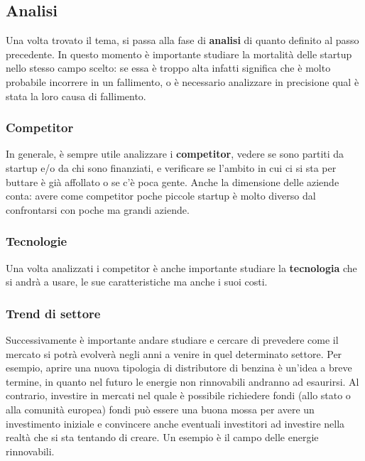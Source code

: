 \subsection{Analisi}
Una volta trovato il tema, si passa alla fase di \textbf{analisi} di quanto
definito al passo precedente. In questo momento è importante studiare la
mortalità delle startup nello stesso campo scelto: se essa è troppo alta
infatti significa che è molto probabile incorrere in un fallimento, o è
necessario analizzare in precisione qual è stata la loro causa di fallimento.

\subsubsection{Competitor}
In generale, è sempre utile analizzare i \textbf{competitor}, vedere se sono
partiti da startup e/o da chi sono finanziati, e verificare se l'ambito in cui
ci si sta per buttare è già affollato o se c'è poca gente. Anche la dimensione
delle aziende conta: avere come competitor poche piccole startup è molto
diverso dal confrontarsi con poche ma grandi aziende.

\subsubsection{Tecnologie}
Una volta analizzati i competitor è anche importante studiare la
\textbf{tecnologia} che si andrà a usare, le sue caratteristiche ma anche i
suoi costi.

\subsubsection{Trend di settore}
Successivamente è importante andare studiare e cercare di prevedere come il
mercato si potrà evolverà negli anni a venire in quel determinato settore.
Per esempio, aprire una nuova tipologia di distributore di benzina è un'idea a
breve termine, in quanto nel futuro le energie non rinnovabili andranno ad
esaurirsi. Al contrario, investire in mercati nel quale è possibile richiedere
fondi (allo stato o alla comunità europea) fondi può essere una buona mossa per
avere un investimento iniziale e convincere anche eventuali investitori ad
investire nella realtà che si sta tentando di creare. Un esempio è il campo
delle energie rinnovabili.

